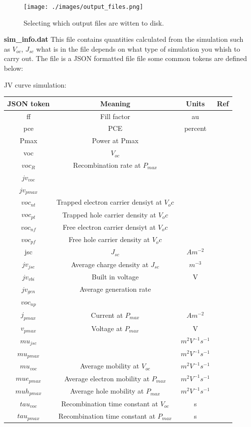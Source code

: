 \begin{figure}
\centering
\texttt{[image: ./images/output\_files.png]}
\caption{Selecting which output files are witten to disk.}
\end{figure}



\textbf{sim\_info.dat}\newline
This file contains quantities calculated from the simulation such as $V_{oc}$, $J_{sc}$ what is in the file depends on what type of simulation you whish to carry out.  The file is a JSON formatted file file some common tokens are defined below:

JV curve simulation:

\begin{center}
\begin{tabular}{ |c|c|c| c|} 
\hline
JSON token & Meaning & Units & Ref \\
\hline
ff & Fill factor&au&\\
pce & 			PCE& percent&\\
Pmax & 			Power at Pmax&&\\
voc & 			$V_{oc}$ &&\\
$voc_{R}$ & 		Recombination rate at $P_{max}$& &\\
$jv_{voc}$  & 		&&\\
$jv_{pmax}$ & 	&&\\
$voc_{nt}$ & Trapped electron carrier densiyt at $V_oc$		&&\\
$voc_{pt}$ & Trapped hole carrier density at $V_oc$		&&\\
$voc_{nf}$ & Free electron carrier densiyt at $V_oc$		&&\\
$voc_{pf}$ & Free hole carrier density at $V_oc$		&&\\
jsc 				  & 	$J_{sc}$		& $Am^{-2}$&\\
$jv_{jsc}$ & Average charge density at $J_{sc}$	& $m^{-3}$&\\
$jv_{vbi}$ & Built in voltage		& V&\\
$jv_{gen}$ & Average generation rate		&&\\
$voc_{np}$ & 	&&\\
$j_{pmax}$ & Current at $P_{max}$		& $Am^{-2}$&\\
$v_{pmax}$ & Voltage at $P_{max}$    & V &\\
$mu_{jsc}$ & 		&$m^{2} V^{-1} s^{-1}$&\\
$mu_{pmax}$ & 		&$m^{2} V^{-1} s^{-1}$&\\
$mu_{voc}$ & 	Average mobility at $V_{oc}$	& $m^{2} V^{-1} s^{-1}$&\\
$mue_{pmax}$ & Average electron mobility at $P_{max}$	&$m^{2} V^{-1} s^{-1}$&\\
$muh_{pmax}$ & Average hole mobility at $P_{max}$ &$m^{2} V^{-1} s^{-1}$&\\
$tau_{voc}$ & 	Recombination time constant at $V_{oc}$	 & s &\\
$tau_{pmax}$ & 	Recombination time constant at $P_{max}$	&s&\\


\end{tabular}
\end{center}
